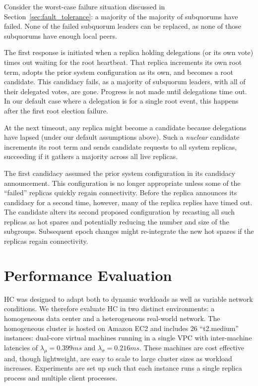 Consider the worst-case failure situation discussed in Section~\ref{sec:fault_tolerance}: a majority of the majority of subquorums have failed.
None of the failed subquorum leaders can be replaced, as none of those subquorums have enough local peers.

The first response is initiated when a replica holding delegations (or its own vote) times out waiting for the root heartbeat.
That replica increments its own root term, adopts the prior system configuration as its own, and becomes a root candidate.
This candidacy fails, as a majority of subquorum leaders, with all of their delegated votes, are gone.
Progress is not made until delegations time out.
In our default case where a delegation is for a single root event, this happens after the first root election failure.

At the next timeout, any replica might become a candidate because delegations have lapsed (under our default assumptions above).
Such a \emph{nuclear} candidate increments its root term and sends candidate requests to all system replicas, succeeding if it gathers a majority across all live replicas.

The first candidacy assumed the prior system configuration in its candidacy announcement.
This configuration is no longer appropriate unless some of the ``failed'' replicas quickly regain connectivity.
Before the replica announces its candidacy for a second time, however, many of the replica replies have timed out.
The candidate alters its second proposed configuration by recasting all such replicas as hot spares and potentially reducing the number and size of the subgroups.
Subsequent epoch changes might re-integrate the new hot spares if the replicas regain connectivity.

\section{Performance Evaluation}
\label{sec:evaluation}

HC was designed to adapt both to dynamic workloads as well as variable network conditions.
We therefore evaluate HC in two distinct environments: a homogeneous data center and a heterogeneous real-world network.
The homogeneous cluster is hosted on Amazon EC2 and includes 26 ``t2.medium'' instances: dual-core virtual machines running in a single VPC with inter-machine latencies of $\lambda_{\mu}=0.399ms$ and $\lambda_{\sigma}=0.216ms$.
These machines are cost effective and, though lightweight, are easy to scale to large cluster sizes as workload increases.
Experiments are set up such that each instance runs a single replica process and multiple client processes.

